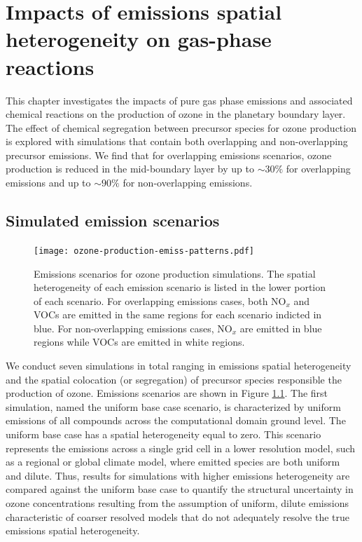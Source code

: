 \chapter{Impacts of emissions spatial heterogeneity on gas-phase reactions}

This chapter investigates the impacts of pure gas phase emissions and associated chemical reactions on the production of ozone in the planetary boundary layer. The effect of chemical segregation between precursor species for ozone production is explored with simulations that contain both overlapping and non-overlapping precursor emissions. We find that for overlapping emissions scenarios, ozone production is reduced in the mid-boundary layer by up to $\sim30\%$ for overlapping emissions and up to $\sim90\%$ for non-overlapping emissions.

\section{Simulated emission scenarios}

\begin{figure}[h]
	\centering
	\texttt{[image: ozone-production-emiss-patterns.pdf]}
	\caption{Emissions scenarios for ozone production simulations. The spatial heterogeneity of each emission scenario is listed in the lower portion of each scenario. For overlapping emissions cases, both NO$_x$ and VOCs are emitted in the same regions for each scenario indicted in blue. For non-overlapping emissions cases, NO$_x$ are emitted in blue regions while VOCs are emitted in white regions.}
	\label{fig:ozone-emission-patterns}
\end{figure}

We conduct seven simulations in total ranging in emissions spatial heterogeneity and the spatial colocation (or segregation) of precursor species responsible the production of ozone. Emissions scenarios are shown in Figure \ref{fig:ozone-emission-patterns}. The first simulation, named the uniform base case scenario, is characterized by uniform emissions of all compounds across the computational domain ground level. The uniform base case has a spatial heterogeneity equal to zero. This scenario represents the emissions across a single grid cell in a lower resolution model, such as a regional or global climate model, where emitted species are both uniform and dilute. Thus, results for simulations with higher emissions heterogeneity are compared against the uniform base case to quantify the structural uncertainty in ozone concentrations resulting from the assumption of uniform, dilute emissions characteristic of coarser resolved models that do not adequately resolve the true emissions spatial heterogeneity.  

